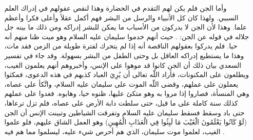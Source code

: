 
وأما الجن فلم يكن لهم التقدم في الحضارة وهذا لنقص عقولهم في إدراك العلم السببي. ولهذا كان كل الأنبياء والرسل من البشر فهم أكمل عقلأ وأعلى فكرا وأعظم علما. وهذا لأن الجن لا يدركون من الأسباب ما يمكن للبشر إدراكه ومن ذلك ما بينه جل جلاله في قوله عن الجن: 
\quranayah*[34][14]{\footnotesize \surahname*[34]}. حيث أنهم خدموا سليمان عليه السلام وهو ميت ظنا منهم أنه حيا. فلم يدركوا بعقولهم الناقصة أنه إذا لم يتحرك لفترة طويلة من الزمن فقد مات، وهذا ما يستطيع إدراكه العاقل بل وحتى الطفل من البشر بسهولة. وقد جاء في تفسير السعدي بيان ذلك أن الجن كانوا قد موهوا على الإنس، وأخبروهم أنهم يعلمون الغيب، ويطلعون على المكنونات، فأراد اللّه تعالى أن يُرِيَ العباد كذبهم في هذه الدعوى، فمكثوا يعملون على عملهم، وقضى اللّه الموت على سليمان عليه السلام، واتَّكأ على عصاه، وهي المنسأة، فصاروا إذا مروا به وهو متكئ عليها، ظنوه حيا، وهابوه. فغدوا على عملهم كذلك سنة كاملة على ما قيل، حتى سلطت دابة الأرض على عصاه، فلم تزل ترعاها، حتى باد وسقط فسقط سليمان عليه السلام وتفرقت الشياطين وتبينت الإنس أن الجن (لَوْ كَانُوا يَعْلَمُونَ الْغَيْبَ مَا لَبِثُوا فِي الْعَذَابِ الْمُهِينِ) وهو العمل الشاق عليهم، فلو علموا الغيب، لعلموا موت سليمان، الذي هم أحرص شيء عليه، ليسلموا مما هم فيه \cite{tafsir_Saadi}. 

